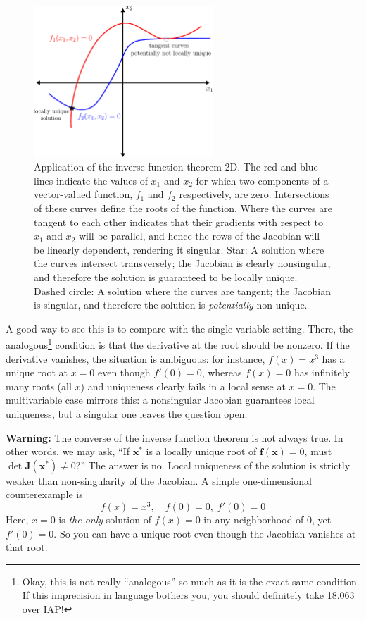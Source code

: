 \begin{figure}[H]
\begin{center}
\includegraphics[width=0.6\textwidth]{figs/nle/local_uniqueness.pdf}
\caption{Application of the inverse function theorem 2D. The red and blue lines indicate the values of $x_1$ and $x_2$ for which two components of a vector-valued function, $f_1$ and $f_2$ respectively, are zero. Intersections of these curves define the roots of the function. Where the curves are tangent to each other indicates that their gradients with respect to $x_1$ and $x_2$ will be parallel, and hence the rows of the Jacobian will be linearly dependent, rendering it singular. Star: A solution where the curves intersect transversely; the Jacobian is clearly nonsingular, and therefore the solution is guaranteed to be locally unique. Dashed circle: A solution where the curves are tangent; the Jacobian is singular, and therefore the solution is \emph{potentially} non-unique. }
\end{center}
\end{figure}

A good way to see this is to compare with the single-variable setting. There, the analogous\footnote{Okay, this is not really ``analogous'' so much as it is the exact same condition. If this imprecision in language bothers you, you should definitely take 18.063 over IAP!} condition is that the derivative at the root should be nonzero. If the derivative vanishes, the situation is ambiguous: for instance, $f(x) = x^3$ has a unique root at $x=0$ even though $f'(0) = 0$, whereas $f(x) = 0$ has infinitely many roots (all $x$) and uniqueness clearly fails in a local sense at $x=0$. The multivariable case mirrors this: a nonsingular Jacobian guarantees local uniqueness, but a singular one leaves the question open.

\begin{warningBox}
    \textbf{Warning:} The converse of the inverse function theorem is not always true. In other words, we may ask, ``If $\mathbf x^*$ is a locally unique root of $\mathbf f(\mathbf x)=0$, must $\det \mathbf J(\mathbf x^*)\neq0$?'' The answer is no. Local uniqueness of the solution is strictly weaker than non-singularity of the Jacobian.  A simple one-dimensional counterexample is
    $$
      f(x) = x^3,\quad f(0)=0,\; f'(0)=0
    $$
    Here, $x=0$ is \textit{the only} solution of $f(x)=0$ in any neighborhood of 0, yet $f'(0)=0$.  So you can have a unique root even though the Jacobian vanishes at that root.
\end{warningBox}



